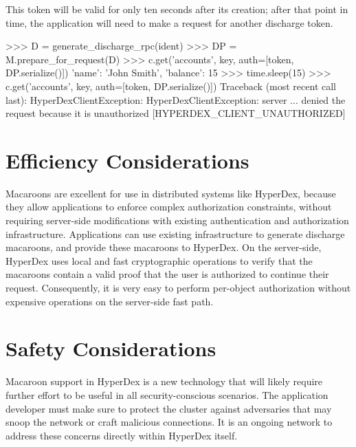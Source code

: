 This token will be valid for only ten seconds after its creation; after that
point in time, the application will need to make a request for another discharge
token.

\begin{pythoncode}
>>> D = generate_discharge_rpc(ident)
>>> DP = M.prepare_for_request(D)
>>> c.get('accounts', key, auth=[token, DP.serialize()])
{'name': 'John Smith', 'balance': 15}
>>> time.sleep(15)
>>> c.get('accounts', key, auth=[token, DP.serialize()])
Traceback (most recent call last):
HyperDexClientException: HyperDexClientException: server ... denied the request because it is unauthorized [HYPERDEX_CLIENT_UNAUTHORIZED]
\end{pythoncode}

\section{Efficiency Considerations}

Macaroons are excellent for use in distributed systems like HyperDex, because
they allow applications to enforce complex authorization constraints, without
requiring server-side modifications with existing authentication and
authorization infrastructure.  Applications can use existing infrastructure to
generate discharge macaroons, and provide these macaroons to HyperDex.  On the
server-side, HyperDex uses local and fast cryptographic operations to verify
that the macaroons contain a valid proof that the user is authorized to continue
their request.  Consequently, it is very easy to perform per-object
authorization without expensive operations on the server-side fast path.

\section{Safety Considerations}

Macaroon support in HyperDex is a new technology that will likely require
further effort to be useful in all security-conscious scenarios.  The
application developer must make sure to protect the cluster against adversaries
that may snoop the network or craft malicious connections.  It is an ongoing
network to address these concerns directly within HyperDex itself.
